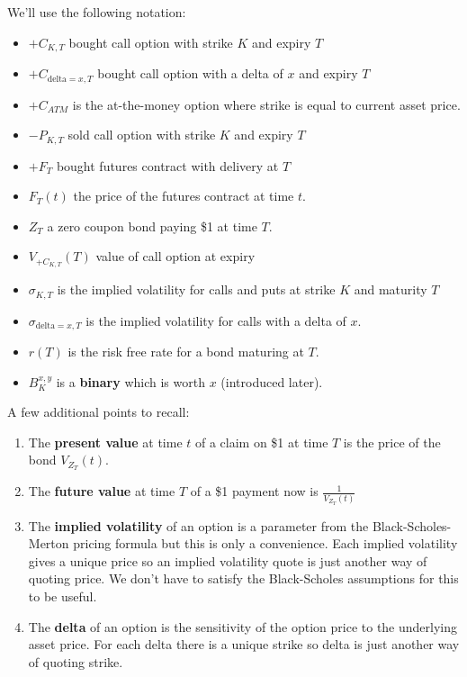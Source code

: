 

We'll use the following notation:

\begin{itemize}
\item $+ C_{K,T}$ bought call option with strike $K$ and expiry $T$
\item $+ C_{\mbox{delta}=x,T}$ bought call option with a delta of $x$ and expiry $T$
\item $+ C_{ATM}$ is the at-the-money option where strike is equal to current asset price.
\item $- P_{K,T}$ sold call option with strike $K$ and expiry $T$
\item $+F_T$ bought  futures contract with delivery at $T$ 
\item $F_T(t)$ the price of the futures contract at time $t$. 
\item $Z_T$ a zero coupon bond paying \$1 at time $T$.
\item $V_{+C_{K,T}}(T)$ value of call option at expiry
\item $\sigma_{K,T}$ is the implied volatility for calls and puts at strike $K$ and maturity $T$
\item $\sigma_{\mbox{delta}=x,T}$ is the implied volatility for calls with a delta of $x$. 
\item $r(T)$ is the risk free rate for a bond maturing at $T$.
\item $B^{x,y}_K$ is a \textbf{binary} which is worth $x$  (introduced later).
\end{itemize}

A few additional points to recall:

\begin{enumerate}
\item The \textbf{present value} at time $t$ of a claim on \$1 at time $T$ is the price of the bond $V_{Z_T}(t)$. 
\item The \textbf{future value} at time $T$ of a \$1 payment now is $\frac{1}{V_{Z_T}(t)}$
\item The \textbf{implied volatility} of an option is a parameter from the Black-Scholes-Merton pricing formula but this is only a convenience. Each implied volatility gives a unique price so an implied volatility quote is just another way of quoting price. We don't have to satisfy the Black-Scholes assumptions for this to be useful.
\item The \textbf{delta} of an option is the sensitivity of the option price to the underlying asset price. For each delta there is a unique strike so delta is just another way of quoting strike.
\end{enumerate}

